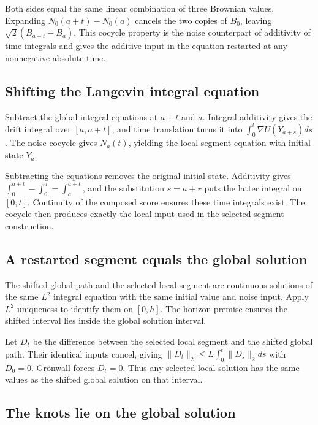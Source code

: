 \documentclass[11pt,a4paper]{article}
\begin{document}
Both sides equal the same linear combination of three Brownian values. Expanding \(N_0(a+t)-N_0(a)\) cancels the two copies of \(B_0\), leaving \(\sqrt2(B_{a+t}-B_a)\). This cocycle property is the noise counterpart of additivity of time integrals and gives the additive input in the equation restarted at any nonnegative absolute time.


\subsection{\texorpdfstring{Shifting the Langevin integral equation}{Shifting the Langevin integral equation}}


Subtract the global integral equations at \(a+t\) and \(a\). Integral additivity gives the drift integral over \([a,a+t]\), and time translation turns it into \(\int_0^t\nabla U(Y_{a+s})ds\). The noise cocycle gives \(N_a(t)\), yielding the local segment equation with initial state \(Y_a\).



Subtracting the equations removes the original initial state. Additivity gives \(\int_0^{a+t}-\int_0^a=\int_a^{a+t}\), and the substitution \(s=a+r\) puts the latter integral on \([0,t]\). Continuity of the composed score ensures these time integrals exist. The cocycle then produces exactly the local input used in the selected segment construction.


\subsection{\texorpdfstring{A restarted segment equals the global solution}{A restarted segment equals the global solution}}


The shifted global path and the selected local segment are continuous solutions of the same \(L^2\) integral equation with the same initial value and noise input. Apply \(L^2\) uniqueness to identify them on \([0,h]\). The horizon premise ensures the shifted interval lies inside the global solution interval.



Let \(D_t\) be the difference between the selected local segment and the shifted global path. Their identical inputs cancel, giving \(\|D_t\|_2\le L\int_0^t\|D_s\|_2ds\) with \(D_0=0\). Grönwall forces \(D_t=0\). Thus any selected local solution has the same values as the shifted global solution on that interval.


\subsection{\texorpdfstring{The knots lie on the global solution}{The knots lie on the global solution}}
\end{document}
